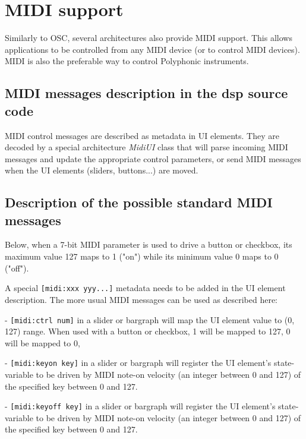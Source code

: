 \chapter{MIDI support} \label{sec:midi}

Similarly to OSC, several \faust architectures also provide MIDI support. This allows \faust applications to be controlled from any MIDI device (or to control MIDI devices). MIDI is also the preferable way to control Polyphonic instruments.

\section{MIDI messages description in the dsp source code}

MIDI control messages are described as metadata in UI elements. They are decoded by a special architecture \emph{MidiUI} class that will parse incoming MIDI messages and update the appropriate control parameters, or send MIDI messages when the UI elements (sliders, buttons...) are moved.

\section{Description of the possible standard MIDI messages}

Below, when a 7-bit MIDI parameter is used to drive a button or
checkbox, its maximum value 127 maps to 1 ("on") while its minimum
value 0 maps to 0 ("off").

A special \lstinline'[midi:xxx yyy...]' metadata needs to be added in the UI  element description. The more usual MIDI messages can be used as described here:

- \lstinline'[midi:ctrl num]' in a slider or bargraph will map the UI element value to (0, 127) range. When used with a button or checkbox, 1 will be mapped to 127, 0 will be mapped to 0,

- \lstinline'[midi:keyon key]' in a slider or bargraph will
register the UI element's state-variable to be driven by MIDI note-on
velocity (an integer between 0 and 127) of the specified key
between 0 and 127.

- \lstinline'[midi:keyoff key]' in a slider or bargraph will
register the UI element's state-variable to be driven by MIDI note-on
velocity (an integer between 0 and 127) of the specified key
between 0 and 127.

